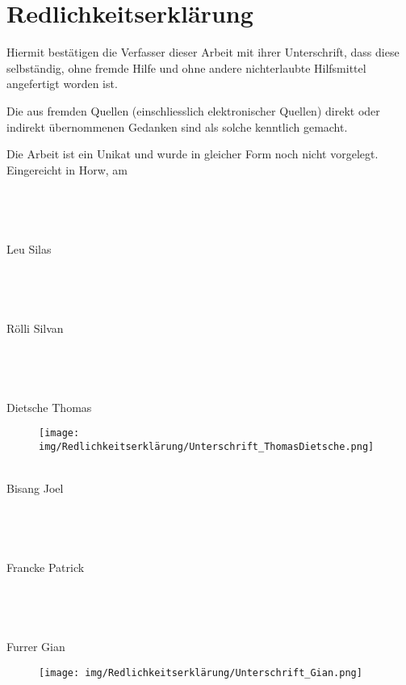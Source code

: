 \documentclass[../main.tex]{subfiles}
\begin{document}
\newpage
\section*{Redlichkeitserklärung}
\thispagestyle{empty}

 
Hiermit bestätigen die Verfasser dieser Arbeit mit ihrer Unterschrift, dass diese selbständig, ohne fremde Hilfe und ohne andere nichterlaubte Hilfsmittel angefertigt worden ist. 

 

Die aus fremden Quellen (einschliesslich elektronischer Quellen) direkt oder indirekt übernommenen Gedanken sind als solche kenntlich gemacht. 

 

Die Arbeit ist ein Unikat und wurde in gleicher Form noch nicht vorgelegt.\\

 

Eingereicht in Horw, am \docdate
\\
\\
\\
\\
\\
Leu Silas
\\
\\
\\
\\
\\
Rölli Silvan
\\
\\
\\
\\
\\
Dietsche Thomas
\begin{figure}[h!]
    \raggedright
    \texttt{[image: img/Redlichkeitserklärung/Unterschrift\_ThomasDietsche.png]}
\end{figure}
\\
Bisang Joel
\\
\\
\\
\\
\\
Francke Patrick
\\
\\
\\
\\
\\
Furrer Gian
\begin{figure}[h!]
    \raggedright
    \texttt{[image: img/Redlichkeitserklärung/Unterschrift\_Gian.png]}
\end{figure}
\end{document}
